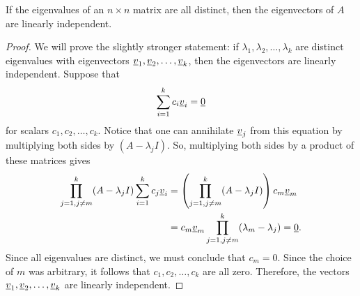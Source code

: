 \begin{theorem}
If the eigenvalues of an $n \times n$ matrix are all distinct, then the eigenvectors of $A$ are linearly independent.
\end{theorem}
\begin{proof}
We will prove the slightly stronger statement: if $\lambda_1 , \lambda_2 , \ldots, \lambda_k $ are distinct eigenvalues with eigenvectors $\underline{v}_1 , \underline{v}_2 , \ldots, \underline{v}_k$, then the eigenvectors are linearly independent.
Suppose that
\begin{equation*}
\sum_{i=1}^k c_i \underline{v}_i = \underline{0}
\end{equation*}
for scalars $c_1, c_2, \ldots, c_k$.
Notice that one can annihilate $\underline{v}_j$ from this equation by multiplying both sides by $(A-\lambda_j I)$.
So, multiplying both sides by a product of these matrices gives
\begin{align*}
\prod_{j=1,j\neq m}^k (A-\lambda_j I) \sum_{i=1}^k c_j \underline{v}_i
&= \left( \prod_{j=1,j\neq m}^k (A-\lambda_j I) \right) c_m \underline{v}_m \\
&= c_m \underline{v}_m \prod_{j=1,j\neq m}^k (\lambda_m - \lambda_j) = \underline{0}.
\end{align*}
Since all eigenvalues are distinct, we must conclude that $c_m = 0$.
Since the choice of $m$ was arbitrary, it follows that $c_1,c_2,\ldots,c_k$ are all zero.
Therefore, the vectors $\underline{v}_1 , \underline{v}_2 , \ldots, \underline{v}_k$ are linearly independent.
\end{proof}

